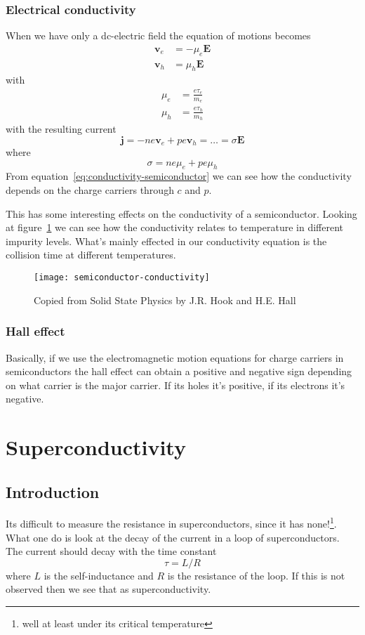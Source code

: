 \documentclass[11pt]{article}
\begin{document}
\subsubsection{Electrical conductivity}
When we have only a dc-electric field the equation of motions becomes
\begin{align}
	\pmb{v}_e &= - \mu_e \pmb{E} \\
	\pmb{v}_h &=  \mu_h \pmb{E} 
\end{align}
with
\begin{align}
	\mu_e &= \frac{e\tau_e}{m_e} \\
	\mu_h &= \frac{e\tau_h}{m_h} 
\end{align}
with the resulting current
\begin{equation}
	\pmb{j} = -ne\pmb{v}_e + pe\pmb{v}_h =\ldots= \sigma \pmb{E}
\end{equation}
where 
\begin{equation}
	\sigma = n e \mu_e + p e \mu_h
	\label{eq:conductivity-semiconductor}
\end{equation}
From equation~\ref{eq:conductivity-semiconductor} we can see how the conductivity depends  on the charge carriers through $c$ and $p$. 

This has some interesting effects on the conductivity of a semiconductor. Looking at figure~\ref{fig:semiconductor-conductivity} we can see how the conductivity relates to temperature in different impurity levels. What's mainly effected in our conductivity equation is the collision time at different temperatures.
\begin{figure}[!ht]
	\centering
	\texttt{[image: semiconductor-conductivity]}
	\caption{Copied from Solid State Physics by J.R. Hook and H.E. Hall}
	\label{fig:semiconductor-conductivity}
\end{figure}
\newpage
\subsubsection{Hall effect}
Basically, if we use the electromagnetic motion equations for charge carriers in semiconductors the hall effect can obtain a positive and negative sign depending on what carrier is the major carrier. If its holes it's positive, if its electrons it's negative.

\section{Superconductivity}
\subsection{Introduction}
Its difficult to measure the resistance in superconductors, since it has none!\footnote{well at least under its critical temperature}. What one do is look at the decay of the current in a loop of superconductors. The current should decay with the time constant
\begin{equation}
	\tau = L/R
\end{equation}
where $L$ is the self-inductance and $R$ is the resistance of the loop. If this is not observed then we see that as superconductivity.
\end{document}
